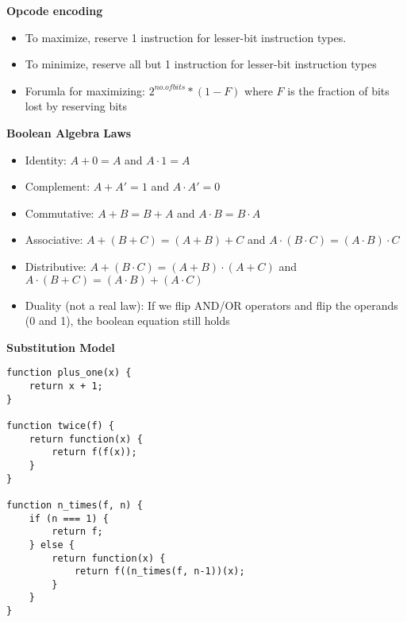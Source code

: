 \documentclass[a4paper]{article} \usepackage[backend=biber, style=numeric, sorting=none]{biblatex}
\begin{document}
\begin{multicols*}{4}
\textbf{Opcode encoding}
\begin{itemize}
\itemsep -0.5em
\item To maximize, reserve 1 instruction for lesser-bit instruction types.
\item To minimize, reserve all but 1 instruction for lesser-bit instruction types
\item Forumla for maximizing: $2^{no. of bits} * (1 - F)$ where $F$ is the fraction of bits lost by reserving bits
\end{itemize}

{\small\textbf{Boolean Algebra}}
\textbf{Laws}
\begin{itemize}
\itemsep -0.5em
\item Identity: $A + 0 = A$ and $A \cdot 1 = A$
\item Complement: $A + A' = 1$ and $A \cdot A' = 0$
\item Commutative: $A + B = B + A$  and $A \cdot B = B \cdot A$
\item Associative: $A + (B + C) = (A + B) + C$ and $A \cdot (B \cdot C) = (A \cdot B) \cdot C$
\item Distributive: $A + (B \cdot C) = (A + B) \cdot (A + C)$ and $A \cdot (B + C) = (A \cdot B) + (A \cdot C)$
\item Duality (not a real law): If we flip AND/OR operators and flip the operands (0 and 1), the boolean equation still holds
\end{itemize}









{\small\textbf{Substitution Model}}
\begin{verbatim}
function plus_one(x) {
    return x + 1;
}

function twice(f) {
    return function(x) {
        return f(f(x));
    }
}

function n_times(f, n) {
    if (n === 1) {
        return f;
    } else {
        return function(x) {
            return f((n_times(f, n-1))(x);
        }
    }
}


\end{verbatim}
\end{multicols*}
\end{document}
